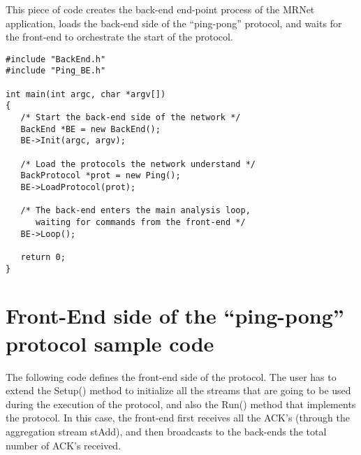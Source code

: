 \documentclass[twoside,a4,english,11pt]{book}
\begin{document}
This piece of code creates the back-end end-point process of the MRNet application, loads the back-end side of the ``ping-pong''
protocol, and waits for the front-end to orchestrate the start of the protocol.

\begin{lstlisting}[frame=single]
#include "BackEnd.h"
#include "Ping_BE.h"

int main(int argc, char *argv[])
{
   /* Start the back-end side of the network */
   BackEnd *BE = new BackEnd();
   BE->Init(argc, argv);

   /* Load the protocols the network understand */
   BackProtocol *prot = new Ping();
   BE->LoadProtocol(prot);

   /* The back-end enters the main analysis loop, 
      waiting for commands from the front-end */
   BE->Loop();

   return 0;
}
\end{lstlisting}

\section{Front-End side of the ``ping-pong'' protocol sample code}

The following code defines the front-end side of the protocol. The user has to extend the 
Setup() method to initialize all the streams that are going to be used during the execution
of the protocol, and also the Run() method that implements the protocol. In this case, 
the front-end first receives all the ACK's (through the aggregation stream stAdd), and 
then broadcasts to the back-ends the total number of ACK's received. 
\end{document}
